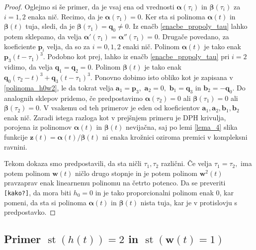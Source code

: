 \documentclass[12pt,a4paper,twoside]{article}
\theoremstyle{definition} %
\theoremstyle{plain} %
\numberwithin{equation}{section}  %
\newcommand{\aV}{\mathbf{a}}
\newcommand{\bV}{\mathbf{b}}
\newcommand{\pV}{\mathbf{p}}
\newcommand{\qV}{\mathbf{q}}
\newcommand{\wV}{\mathbf{w}}
\newcommand{\zV}{\mathbf{z}}
\newcommand{\balpha}{\boldsymbol \alpha}
\newcommand{\bbeta}{\boldsymbol \beta}
\DeclareMathOperator{\st}{st}
\begin{document}
\begin{proof}
	Oglejmo si še primer, da je vsaj ena od vrednosti $\balpha(\tau_i)$ in $\bbeta(\tau_i)$ za $i=1,2$ enaka nič. Recimo, da je $\balpha(\tau_1)=0.$ Ker sta si polinoma $\balpha(t)$ in $\bbeta(t)$ tuja, sledi, da je $\bbeta(\tau_1)=\qV_0\neq0.$ Iz enačb \eqref{enacbe_propoly_tau} lahko potem sklepamo, da velja $\balpha'(\tau_1)=\balpha''(\tau_1)=0.$ Drugače povedano, za koeficiente $\pV_i$ velja, da so za $i=0,1,2$ enaki nič. Polinom $\balpha(t)$ je tako enak $\pV_3(t-\tau_1)^3.$ Podobno kot prej, lahko iz enačb \eqref{enacbe_propoly_tau} pri $i=2$ vidimo, da velja $\qV_1=\qV_2=0.$ Polinom $\bbeta(t)$ je tako enak $\qV_0(\tau_2-t)^3+\qV_3(t-\tau_1)^3.$ Ponovno dobimo isto obliko kot je zapisana v \eqref{polinoma_h0w2}, le da tokrat velja $\aV_1=\pV_3,$ $\aV_2=0,$ $\bV_1=\qV_3$ in $\bV_2=-\qV_0.$ Do analognih sklepov pridemo, če predpostavimo $\balpha(\tau_2)=0$ ali $\bbeta(\tau_1)=0$ ali $\bbeta(\tau_2)=0.$ V vsakemu od teh primerov je eden od koeficientov $\aV_1,\aV_2,\bV_1,\bV_2$ enak nič. Zaradi istega razloga kot v prejšnjem primeru je DPH krivulja, porojena iz polinomov $\balpha(t)$ in $\bbeta(t)$ nevijačna, saj po lemi \ref{lema_4} slika funkcije $\zV(t)=\balpha(t)/\bbeta(t)$ ni enaka krožnici oziroma premici v kompleksni ravnini.
	
	Tekom dokaza smo predpostavili, da sta ničli $\tau_1,\tau_2$ različni. Če velja $\tau_1=\tau_2,$ ima potem polinom $\wV(t)$ ničlo drugo stopnje in je potem polinom $\wV^2(t)$ pravzaprav enak linearnemu polinomu na četrto potenco. Da se preveriti \texttt{[kako?]}, da mora biti $h_0=0$ in je tako proporcionalni polinom enak 0, kar pomeni, da sta si polinoma $\balpha(t)$ in $\bbeta(t)$ nista tuja, kar je v protislovju s predpostavko.
\end{proof}

\subsection{Primer \texorpdfstring{$\st(h(t))=2$}{st(h(t))=2} in \texorpdfstring{$\st(\wV(t)=1)$}{st(w(t))=1}}
\label{locevanje_h2w1}
\end{document}
